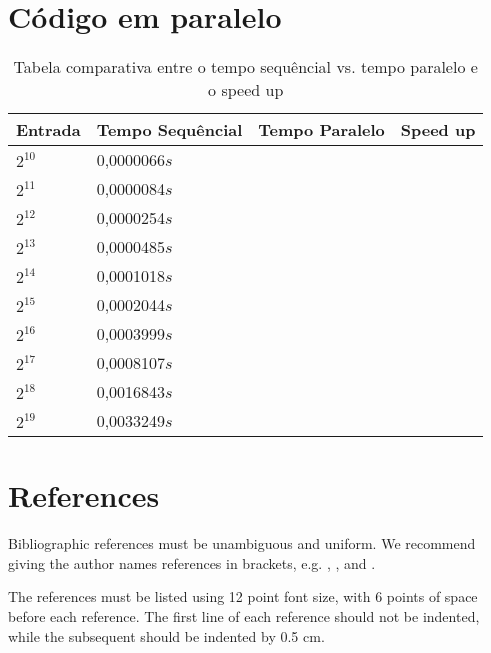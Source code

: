 \documentclass[a4paper, 12pt]{article}
\begin{document}
\section{Código em paralelo}
\begin{table}[!h]
\centering
\begin{tabular}{|l|l|l|l|}
\hline
       Entrada & Tempo Sequêncial & Tempo Paralelo & Speed up \\ \hline
                     $2^{10}$ & 0,0000066$s$ &  &  \\ \hline
                     $2^{11}$ & 0,0000084$s$ &  &  \\ \hline
                     $2^{12}$ & 0,0000254$s$ &  &  \\ \hline
                     $2^{13}$ & 0,0000485$s$ &  &  \\ \hline
                     $2^{14}$ & 0,0001018$s$ &  &  \\ \hline
                     $2^{15}$ & 0,0002044$s$ &  &  \\ \hline
                     $2^{16}$ & 0,0003999$s$ &  &  \\ \hline
                     $2^{17}$ & 0,0008107$s$ &  &  \\ \hline
                     $2^{18}$ & 0,0016843$s$ &  &  \\ \hline
                     $2^{19}$ & 0,0033249$s$ &  &  \\ \hline
                    
\end{tabular}
\caption{Tabela comparativa entre o tempo sequêncial vs. tempo paralelo e o speed up}
\end{table}

\section{References}

Bibliographic references must be unambiguous and uniform.  We recommend giving
the author names references in brackets, e.g. \cite{knuth:84},
\cite{boulic:91}, and \cite{smith:99}.

The references must be listed using 12 point font size, with 6 points of space
before each reference. The first line of each reference should not be
indented, while the subsequent should be indented by 0.5 cm.



\end{document}

